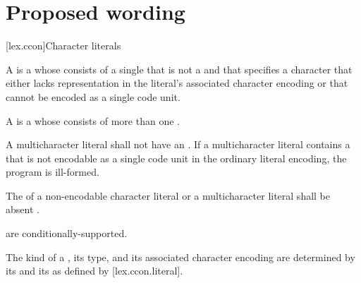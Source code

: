 \documentclass{wg21}
\begin{document}
\section{Proposed wording}


[lex.ccon]{Character literals}

\pnum
{}%
%
%
%
%
%
%
%
%
%
\begin{removedblock}
A 
is a 
whose  consists of a single 
that is not a  and
that specifies a character
that either lacks representation in the literal's associated character encoding
or that cannot be encoded as a single code unit.
\end{removedblock}
A  is a 
whose  consists of
more than one .
\begin{addedblock}
A multicharacter literal shall not have an .
If a multicharacter literal contains a  that is not encodable as a single code unit in the ordinary literal encoding, the program is ill-formed.
\end{addedblock}

\begin{removedblock}
The  of
a non-encodable character literal or
a multicharacter literal
shall be absent .
\end{removedblock}

 are conditionally-supported.

\pnum
The kind of a ,
its type, and its associated character encoding
are determined by
its  and its 
as defined by [lex.ccon.literal].
\end{document}
